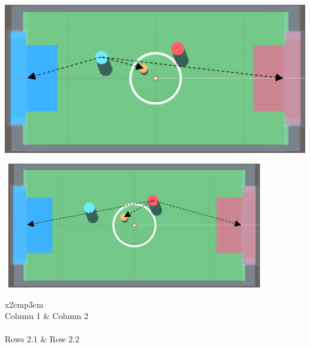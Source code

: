 \includegraphics[scale=0.2]{img/Image1.png}


\includegraphics[width=115mm, height=55mm]{img/Image2.png}

\begin{table}[h]
  \centering
  \begin{tabular}{x{2cm}p{3cm}}
    \toprule \\
    Column 1 & Column 2 \\
    \midrule \\
    Rows 2.1 & Row 2.2 \\
    \bottomrule
  \end{tabular}
  \caption{A table.}
  \label{table:mytable}
\end{table}